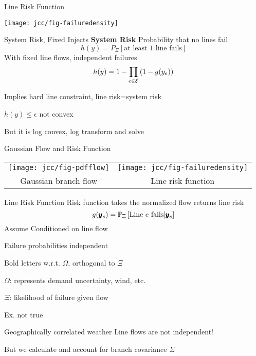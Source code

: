 \begin{frame}{Line Risk Function}
\begin{center}
\texttt{[image: jcc/fig-failuredensity]}
\end{center}
\end{frame}

\begin{frame}{System Risk, Fixed Injects}
\textbf{System Risk} Probability that no lines fail
\begin{equation*}
 h(y) = P_\Xi \left[ \mbox{at least 1 line fails} \right] 
\end{equation*}
\pause
With fixed line flows, independent failures
\begin{equation*}  
h(y) = 1 - \prod_{e \in {\cal E}} \left( 1 - g(y_e) \right)
\end{equation*}  
\pause
\bi
\item Implies hard line constraint, line risk=system risk
\item $h(y) \leq \epsilon$ not convex
\bi
\item But it is log convex, log transform and solve
\ei
\ei

\end{frame}



\begin{frame}{Gaussian Flow and Risk Function}
\begin{center}
\begin{tabular}{c c}
\texttt{[image: jcc/fig-pdfflow]}
&
\texttt{[image: jcc/fig-failuredensity]}\\
\hspace{10pt}Gaussian branch flow & \hspace{10pt}Line risk function 
\end{tabular}
\end{center}
\end{frame}

\begin{frame}{Line Risk Function}
Risk function takes the normalized flow returns line risk 
\begin{equation*}
 g(\pmb{y}_e) = \mathbb{P}_{\Xi} \left[ \text{Line }e\text{ fails} | \pmb{y}_e \right] 
\end{equation*}
\pause
\alert{Assume} Conditioned on line flow
\bi
\item Failure probabilities independent
\item Bold letters w.r.t. $\Omega$, orthogonal to $\Xi$
\bi
\item $\Omega$: represents demand uncertainty, wind, etc.
\item $\Xi$: likelihood of failure given flow
\ei
\item Ex. not true
\bi
\item Geographically correlated weather
\ei
\ei
\pause
\alert{Line flows are not independent!}
\bi
\item But we calculate and account for branch covariance $\Sigma$
\ei
\vspace{25pt}
\end{frame}



